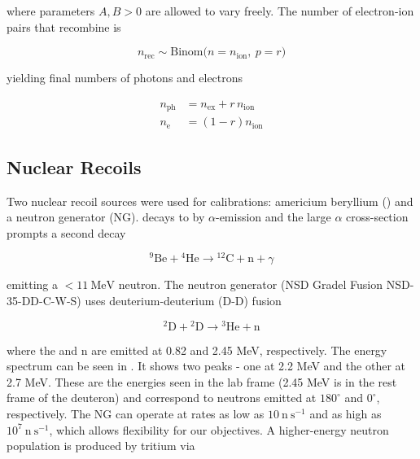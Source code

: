 \noindent where parameters $A,B > 0$ are allowed to vary freely.  The number of electron-ion pairs that recombine is

\vspace{-10pt}

\begin{equation}
n_{\mathrm{rec}} \sim \mathrm{Binom} \big(n = n_{\mathrm{ion}},\ p = r \big)
\end{equation}

\noindent yielding final numbers of photons and electrons

\vspace{-30pt}

\begin{subequations}
\begin{align}
n_{\mathrm{ph}} &= n_{\mathrm{ex}} + r\, n_{\mathrm{ion}} \\
n_{\mathrm{e}} &= (1 - r) n_{\mathrm{ion}}
\end{align}
\end{subequations}



\subsection{Nuclear Recoils}
\label{subsec:er_nr_calibrations_parameter_determ_nr}
Two nuclear recoil sources were used for calibrations: americium beryllium () and a neutron generator
(NG).   decays to  by $\alpha$-emission and the large  $\alpha$ cross-section prompts a second decay

\vspace{-10pt}

\begin{equation}
\mathrm{^{9}Be} + \mathrm{^{4}He} \rightarrow \mathrm{^{12}C + n} + \gamma
\end{equation}

\noindent emitting a $< 11\ \mathrm{MeV}$ neutron.  The neutron generator (NSD Gradel Fusion NSD-35-DD-C-W-S) uses
deuterium-deuterium (D-D) fusion

\vspace{-10pt}

\begin{equation}
\mathrm{^{2}D} + \mathrm{^{2}D} \rightarrow \mathrm{^{3}He} + \mathrm{n}
\end{equation}

\noindent where the  and n are emitted at 0.82 and 2.45 MeV, respectively.  The energy spectrum can be seen in
.  It shows two peaks - one at 2.2 MeV and the other at 2.7 MeV.  These
are the energies seen in the lab frame (2.45 MeV is in the rest frame of the deuteron) and correspond to neutrons emitted at $180^{\circ}$
and $0^{\circ}$, respectively.  The NG can operate at rates as low as $10\ \mathrm{n\ s^{-1}}$
and as high as $10^7\ \mathrm{n\ s^{-1}}$, which allows flexibility for our objectives.  A higher-energy neutron
population is produced by tritium via

